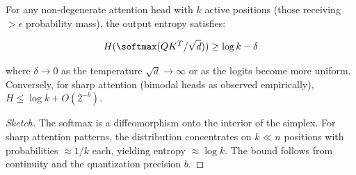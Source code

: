 \begin{lemma}






\label{lem:softmax-entropy}






For any non-degenerate attention head with $k$ active positions (those receiving $> \epsilon$ probability mass), the output entropy satisfies:






\[






H(\softmax(QK^T/\sqrt{d})) \geq \log k - \delta






\]






where $\delta \to 0$ as the temperature $\sqrt{d} \to \infty$ or as the logits become more uniform. Conversely, for sharp attention (bimodal heads as observed empirically), $H \leq \log k + O(2^{-b})$.






\end{lemma}













\begin{proof}[Sketch]






The softmax is a diffeomorphism onto the interior of the simplex. For sharp attention patterns, the distribution concentrates on $k \ll n$ positions with probabilities $\approx 1/k$ each, yielding entropy $\approx \log k$. The bound follows from continuity and the quantization precision $b$.






\end{proof}













